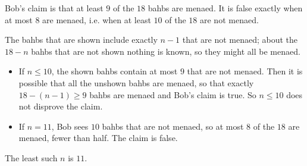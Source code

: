 Bob's claim is that at least $9$ of the $18$ bahbs are menaed. It is false exactly when at most $8$ are menaed, i.e. when at least $10$ of the $18$ are not menaed.

The bahbs that are shown include exactly $n-1$ that are not menaed; about the $18-n$ bahbs that are not shown nothing is known, so they might all be menaed.
\begin{itemize}
\item If $n\le10$, the shown bahbs contain at most $9$ that are not menaed. Then it is possible that all the unshown bahbs are menaed, so that exactly $18-(n-1)\ge9$ bahbs are menaed and Bob's claim is true. So $n\le10$ does not disprove the claim.
\item If $n=11$, Bob sees $10$ bahbs that are not menaed, so at most $8$ of the $18$ are menaed, fewer than half. The claim is false.
\end{itemize}
The least such $n$ is $\boxed{11}$.
